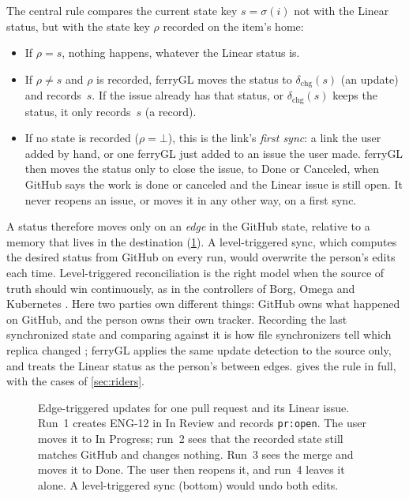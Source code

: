 \documentclass[11pt,a4paper]{article}
\newcommand{\ferry}{ferryGL}
\newcommand{\key}[1]{\texttt{#1}}
\newcommand{\status}[1]{\textsf{#1}}
\newcommand{\action}[1]{\textsf{#1}}
\begin{document}
The central rule compares the current state key $s=\sigma(i)$ not with the Linear status, but
with the state key $\rho$ recorded on the item's home:
\begin{itemize}
  \item If $\rho = s$, nothing happens, whatever the Linear status is.
  \item If $\rho \neq s$ and $\rho$ is recorded, \ferry{} moves the status to
    $\delta_{\text{chg}}(s)$ (an \action{update}) and records~$s$. If the issue already has
    that status, or $\delta_{\text{chg}}(s)$ keeps the status, it only records~$s$ (a
    \action{record}).
  \item If no state is recorded ($\rho=\bot$), this is the link's \emph{first sync}: a link the
    user added by hand, or one \ferry{} just added to an issue the user made. \ferry{} then
    moves the status only to close the issue, to \status{Done} or \status{Canceled}, when
    GitHub says the work is done or canceled and the Linear issue is still open. It never
    reopens an issue, or moves it in any other way, on a first sync.
\end{itemize}
A status therefore moves only on an \emph{edge} in the GitHub state, relative to a memory that
lives in the destination (\cref{fig:timeline}). A level-triggered sync, which computes the
desired status from GitHub on every run, would overwrite the person's edits each time.
Level-triggered reconciliation is the right model when the source of truth should win
continuously, as in the controllers of Borg, Omega and Kubernetes \cite{burns2016borg}. Here
two parties own different things: GitHub owns what happened on GitHub, and the person owns
their own tracker. Recording the last synchronized state and comparing against it is how file
synchronizers tell which replica changed \cite{balasubramaniam1998file, pierce2004unison};
\ferry{} applies the same update detection to the source only, and treats the Linear status as
the person's between edges.  gives the rule in full, with the cases of
\cref{sec:riders}.

\begin{figure}[t]
  \centering
  
  \caption{Edge-triggered updates for one pull request and its Linear issue. Run~1 creates
    ENG-12 in \status{In Review} and records \key{pr:open}. The user moves it to
    \status{In Progress}; run~2 sees that the recorded state still matches GitHub and changes
    nothing. Run~3 sees the merge and moves it to \status{Done}. The user then reopens it, and
    run~4 leaves it alone. A level-triggered sync (bottom) would undo both edits.}
  \label{fig:timeline}
\end{figure}
\end{document}
